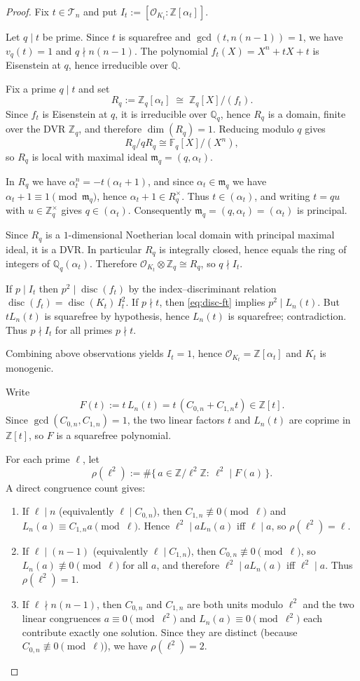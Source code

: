 \documentclass[11pt,letterpaper]{amsart}
\newcommand{\Z}{\mathbb{Z}}
\newcommand{\Q}{\mathbb{Q}}
\newcommand{\F}{\mathbb{F}}
\newcommand{\Ocal}{\mathcal{O}}
\newcommand{\disc}{\operatorname{disc}}
\theoremstyle{plain}
\theoremstyle{definition}
\theoremstyle{remark}
\theoremstyle{plain}
\begin{document}
\begin{proof}
Fix $t\in\mathcal T_n$ and put $I_t:=[\Ocal_{K_t}:\Z[\alpha_t]]$.

Let $q\mid t$ be prime. Since $t$ is squarefree and $\gcd(t,n(n-1))=1$, we have $v_q(t)=1$ and $q\nmid n(n-1)$.
The polynomial $f_t(X)=X^n+tX+t$ is Eisenstein at $q$, hence irreducible over $\Q$.


Fix a prime $q\mid t$ and set
\[
R_q:=\Z_q[\alpha_t]\;\cong\;\Z_q[X]/(f_t).
\]
Since $f_t$ is Eisenstein at $q$, it is irreducible over $\Q_q$, hence $R_q$ is a domain, finite over the DVR $\Z_q$,
and therefore $\dim(R_q)=1$. Reducing modulo $q$ gives
\[
R_q/qR_q \cong \F_q[X]/(X^n),
\]
so $R_q$ is local with maximal ideal $\mathfrak m_q=(q,\alpha_t)$.

In $R_q$ we have $\alpha_t^n=-t(\alpha_t+1)$, and since $\alpha_t\in\mathfrak m_q$ we have
$\alpha_t+1\equiv 1\pmod{\mathfrak m_q}$, hence $\alpha_t+1\in R_q^\times$.
Thus $t\in(\alpha_t)$, and writing $t=qu$ with $u\in\Z_q^\times$ gives $q\in(\alpha_t)$.
Consequently $\mathfrak m_q=(q,\alpha_t)=(\alpha_t)$ is principal.

Since $R_q$ is a $1$-dimensional Noetherian local domain with principal maximal ideal, it is a DVR.
In particular $R_q$ is integrally closed, hence equals the ring of integers of $\Q_q(\alpha_t)$.
Therefore $\Ocal_{K_t}\otimes\Z_q \cong R_q$, so $q\nmid I_t$.


If $p\mid I_t$ then $p^2\mid \disc(f_t)$ by the index--discriminant relation
$\disc(f_t)=\disc(K_t)\,I_t^2$.
If $p\nmid t$, then \eqref{eq:disc-ft} implies $p^2\mid L_n(t)$.
But $tL_n(t)$ is squarefree by hypothesis, hence $L_n(t)$ is squarefree; contradiction.
Thus $p\nmid I_t$ for all primes $p\nmid t$.

Combining above observations yields $I_t=1$, hence $\Ocal_{K_t}=\Z[\alpha_t]$ and $K_t$ is monogenic.


Write
\[
F(t):=t\,L_n(t)=t\,(C_{0,n}+C_{1,n}t)\in\Z[t].
\]
Since $\gcd(C_{0,n},C_{1,n})=1$, the two linear factors $t$ and $L_n(t)$ are coprime in $\Z[t]$,
so $F$ is a squarefree polynomial.

For each prime $\ell$, let
\[
\rho(\ell^2):=\#\{\,a\in\Z/\ell^2\Z:\ \ell^2\mid F(a)\,\}.
\]
A direct congruence count gives:
\begin{enumerate}[label=\textup{(\roman*)}]
\item If $\ell\mid n$ (equivalently $\ell\mid C_{0,n}$), then $C_{1,n}\not\equiv 0\pmod\ell$ and
$L_n(a)\equiv C_{1,n}a\pmod\ell$. Hence $\ell^2\mid aL_n(a)$ iff $\ell\mid a$, so $\rho(\ell^2)=\ell$.
\item If $\ell\mid (n-1)$ (equivalently $\ell\mid C_{1,n}$), then $C_{0,n}\not\equiv 0\pmod\ell$, so
$L_n(a)\not\equiv 0\pmod\ell$ for all $a$, and therefore $\ell^2\mid aL_n(a)$ iff $\ell^2\mid a$.
Thus $\rho(\ell^2)=1$.
\item If $\ell\nmid n(n-1)$, then $C_{0,n}$ and $C_{1,n}$ are both units modulo $\ell^2$ and the two linear
congruences $a\equiv 0\pmod{\ell^2}$ and $L_n(a)\equiv 0\pmod{\ell^2}$ each contribute exactly one solution.
Since they are distinct (because $C_{0,n}\not\equiv 0\pmod\ell$), we have $\rho(\ell^2)=2$.
\end{enumerate}


\end{proof}
\end{document}
